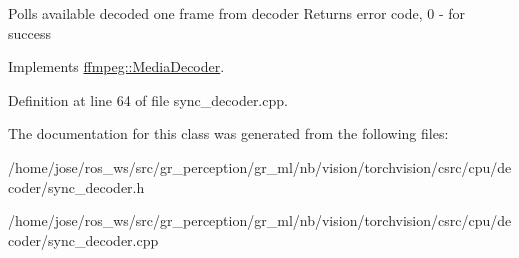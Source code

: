 Polls available decoded one frame from decoder Returns error code, 0 -\/ for success 

Implements \hyperlink{classffmpeg_1_1MediaDecoder_a20109fcef8c1c83eece3f30094ae4deb}{ffmpeg\+::\+Media\+Decoder}.



Definition at line 64 of file sync\+\_\+decoder.\+cpp.



The documentation for this class was generated from the following files\+:\begin{DoxyCompactItemize}
\item 
/home/jose/ros\+\_\+ws/src/gr\+\_\+perception/gr\+\_\+ml/nb/vision/torchvision/csrc/cpu/decoder/sync\+\_\+decoder.\+h\item 
/home/jose/ros\+\_\+ws/src/gr\+\_\+perception/gr\+\_\+ml/nb/vision/torchvision/csrc/cpu/decoder/sync\+\_\+decoder.\+cpp\end{DoxyCompactItemize}
